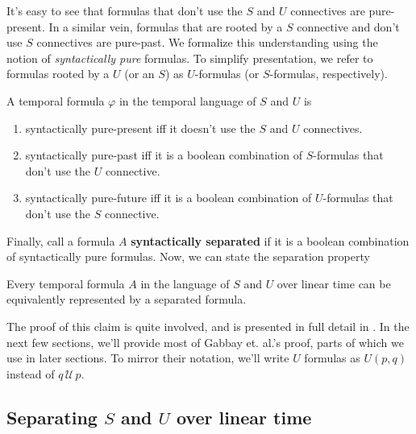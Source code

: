 \documentclass[a4paper,UKenglish,cleveref, autoref, thm-restate, numberwithinsect]{lipics-v2021}
\begin{document}
It's easy to see that formulas that don't use the $S$ and $U$ connectives are pure-present. In a similar vein, formulas that are rooted by a $S$ connective and don't use $S$ connectives are pure-past. We formalize this understanding using the notion of \textit{syntactically pure} formulas. To simplify presentation, we refer to formulas rooted by a $U$ (or an $S$) as $U$-formulas (or $S$-formulas, respectively).
\begin{definition}
    A temporal formula $\varphi$ in the temporal language of $S$ and $U$ is
    \begin{enumerate}
        \item syntactically pure-present iff it doesn't use the $S$ and $U$ connectives.
        \item syntactically pure-past iff it is a boolean combination of $S$-formulas that don't use the $U$ connective.
        \item syntactically pure-future iff it is a boolean combination of $U$-formulas that don't use the $S$ connective.
    \end{enumerate}
\end{definition}

Finally, call a formula $A$ \textbf{syntactically separated} if it is a boolean combination of syntactically pure formulas. Now, we can state the separation property
\begin{claim*}
    \label{claim:separation-property-linear-time}
    Every temporal formula $A$ in the language of $S$ and $U$ over linear time can be equivalently represented by a separated formula.
\end{claim*}
The proof of this claim is quite involved, and is presented in full detail in \cite{gabbay1994, DecPastImpFuture89}. In the next few sections, we'll provide most of Gabbay et. al.'s proof, parts of which we use in later sections. To mirror their notation, we'll write $U$ formulas as $U(p, q)$ instead of $q \,\mathcal{U}\, p$.

\subsection{Separating $S$ and $U$ over linear time}
\end{document}

